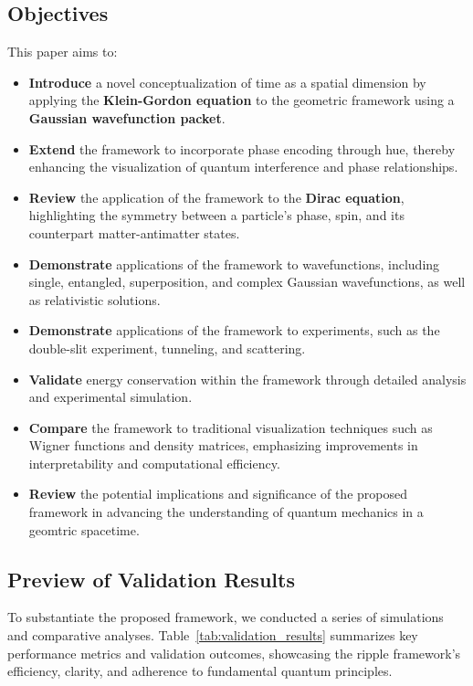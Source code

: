 \documentclass[12pt]{article}
\begin{document}
\subsection{Objectives}

This paper aims to:

\begin{itemize}
    \item \textbf{Introduce} a novel conceptualization of time as a spatial dimension by applying the \textbf{Klein-Gordon equation} to the geometric framework using a \textbf{Gaussian wavefunction packet}.
    \item \textbf{Extend} the framework to incorporate phase encoding through hue, thereby enhancing the visualization of quantum interference and phase relationships.
    \item \textbf{Review} the application of the framework to the \textbf{Dirac equation}, highlighting the symmetry between a particle's phase, spin, and its counterpart matter-antimatter states.
    \item \textbf{Demonstrate} applications of the framework to wavefunctions, including single, entangled, superposition, and complex Gaussian wavefunctions, as well as relativistic solutions.
    \item \textbf{Demonstrate} applications of the framework to experiments, such as the double-slit experiment, tunneling, and scattering.
    \item \textbf{Validate} energy conservation within the framework through detailed analysis and experimental simulation.
    \item \textbf{Compare} the framework to traditional visualization techniques such as Wigner functions and density matrices, emphasizing improvements in interpretability and computational efficiency.
    \item \textbf{Review} the potential implications and significance of the proposed framework in advancing the understanding of quantum mechanics in a geomtric spacetime.
\end{itemize}


\subsection{Preview of Validation Results}

To substantiate the proposed framework, we conducted a series of simulations and comparative analyses. Table~\ref{tab:validation_results} summarizes key performance metrics and validation outcomes, showcasing the ripple framework's efficiency, clarity, and adherence to fundamental quantum principles.
\end{document}
